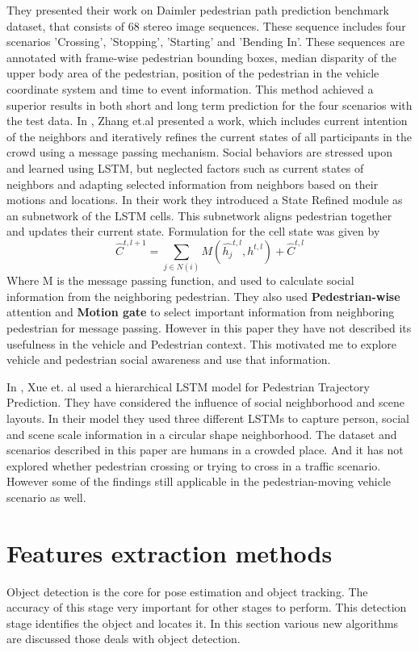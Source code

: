 They presented their work on Daimler pedestrian path prediction benchmark dataset, that consists of 68 stereo image sequences. These sequence includes four scenarios 'Crossing', 'Stopping', 'Starting' and 'Bending In'. These sequences are annotated with frame-wise pedestrian bounding boxes, median disparity of the upper body area of the pedestrian, position of the pedestrian in the vehicle coordinate system and time to event information. This method achieved a superior results in both short and long term prediction for the four scenarios with the test data.
In \cite{zhang2019sr}, Zhang et.al presented a work, which includes current intention of the neighbors and iteratively refines the current states of all participants in the crowd using a message passing mechanism. Social behaviors are stressed upon and learned using LSTM, but \cite{zhang2019sr} neglected factors such as current states of neighbors and adapting selected information from neighbors based on their motions and locations. In their work they introduced a State Refined module as an subnetwork of the LSTM cells. This subnetwork aligns pedestrian together and updates their current state. Formulation for the cell state was given by 
\begin{equation}
\hat{C}^{t, l+1}= \sum_{j\in N(i)}M(\hat{h_j}^{t, l}, {h}^{t, l}) + \hat{C}^{t, l}
\end{equation}
Where M is the message passing function, and used to calculate social information from the neighboring pedestrian. They also used \textbf{Pedestrian-wise }attention and \textbf{Motion gate} to select important information from neighboring pedestrian for message passing. However in this paper they have not described its usefulness in the vehicle and Pedestrian context. This motivated me to explore vehicle and pedestrian social awareness and use that information.

In \cite{xue2018ss}, Xue et. al used a hierarchical LSTM model for Pedestrian Trajectory Prediction. They have considered the influence of social neighborhood and scene layouts. In their model they used three different LSTMs to capture person, social and scene scale information in a circular shape neighborhood. The dataset and scenarios described in this paper are humans in a crowded place. And it has not explored whether pedestrian crossing or trying to cross in a traffic scenario. However some of the findings still applicable in the pedestrian-moving vehicle scenario as well.


\section{Features extraction methods}
Object detection \cite{felzenszwalb2009object, walk2010new, liu2016ssd, szegedy2014scalable, dollar2009pedestrian, dollar2011pedestrian} is the core for pose estimation and object tracking. The accuracy of this stage very important for other stages to perform. This detection stage identifies the object and locates it. In this section various new algorithms are discussed those deals with object detection.
